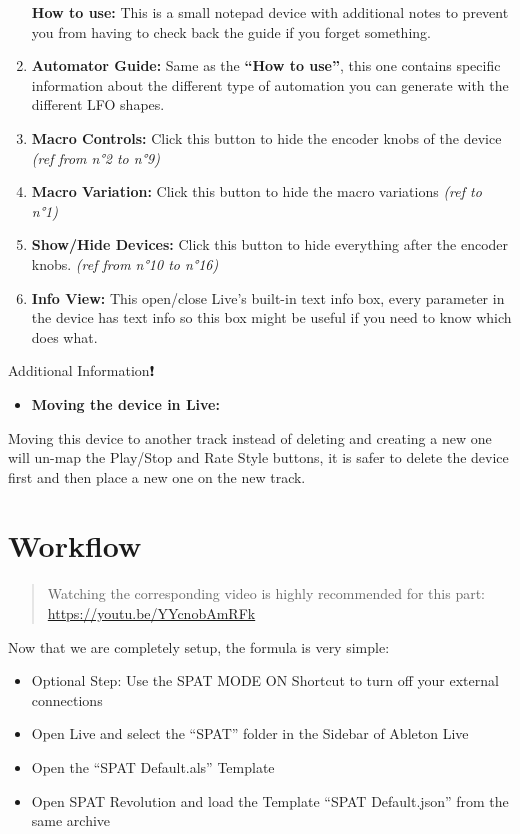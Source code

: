\documentclass[
  letterpaper,
  DIV=11,
  numbers=noendperiod]{scrreport}
\providecommand{\tightlist}{%
  \setlength{\itemsep}{0pt}\setlength{\parskip}{0pt}}\usepackage{longtable,booktabs,array}
\begin{document}
\begin{enumerate}
  \textbf{How to use:} This is a small notepad device with additional
  notes to prevent you from having to check back the guide if you forget
  something.
\item
  \textbf{Automator Guide:} Same as the \textbf{``How to use''}, this
  one contains specific information about the different type of
  automation you can generate with the different LFO shapes.
\item
  \textbf{Macro Controls:} Click this button to hide the encoder knobs
  of the device \emph{(ref from n°2 to n°9)}
\item
  \textbf{Macro Variation:} Click this button to hide the macro
  variations \emph{(ref to n°1)}
\item
  \textbf{Show/Hide Devices:} Click this button to hide everything after
  the encoder knobs. \emph{(ref from n°10 to n°16)}
\item
  \textbf{Info View:} This open/close Live's built-in text info box,
  every parameter in the device has text info so this box might be
  useful if you need to know which does what.
\end{enumerate}

Additional Information❗️

\begin{itemize}
\tightlist
\item
  \textbf{Moving the device in Live:}
\end{itemize}

Moving this device to another track instead of deleting and creating a
new one will un-map the Play/Stop and Rate Style buttons, it is safer to
delete the device first and then place a new one on the new track.

\hypertarget{workflow-1}{%
\section{Workflow}\label{workflow-1}}

\begin{quote}
Watching the corresponding video is highly recommended for this part:
\url{https://youtu.be/YYcnobAmRFk}
\end{quote}

Now that we are completely setup, the formula is very simple:

\begin{itemize}
\tightlist
\item
  Optional Step: Use the SPAT MODE ON Shortcut to turn off your external
  connections
\item
  Open Live and select the ``SPAT'' folder in the Sidebar of Ableton
  Live
\item
  Open the ``SPAT Default.als'' Template
\item
  Open SPAT Revolution and load the Template ``SPAT Default.json'' from
  the same archive
\end{itemize}
\end{document}
